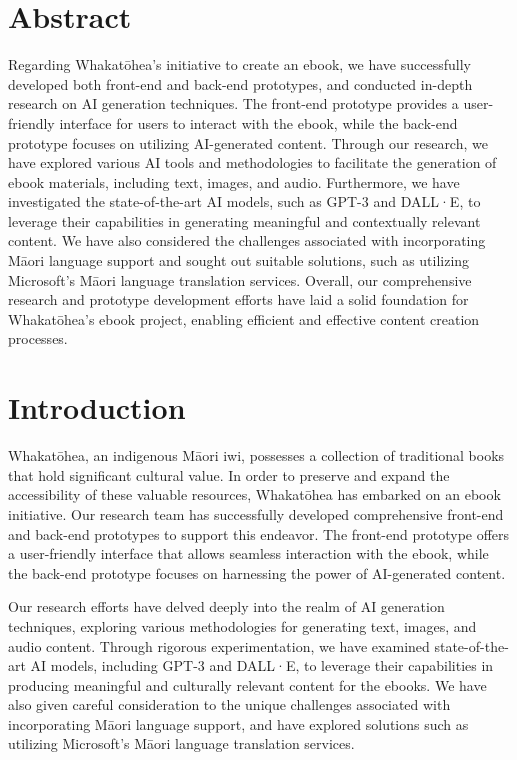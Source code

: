 \chapter{Abstract}

Regarding Whakatōhea's initiative to create an ebook, we have successfully developed both front-end and back-end prototypes, and conducted in-depth research on AI generation techniques. The front-end prototype provides a user-friendly interface for users to interact with the ebook, while the back-end prototype focuses on utilizing AI-generated content. Through our research, we have explored various AI tools and methodologies to facilitate the generation of ebook materials, including text, images, and audio. Furthermore, we have investigated the state-of-the-art AI models, such as GPT-3 and DALL·E, to leverage their capabilities in generating meaningful and contextually relevant content. We have also considered the challenges associated with incorporating Māori language support and sought out suitable solutions, such as utilizing Microsoft's Māori language translation services. Overall, our comprehensive research and prototype development efforts have laid a solid foundation for Whakatōhea's ebook project, enabling efficient and effective content creation processes.

\chapter{Introduction}

Whakatōhea, an indigenous Māori iwi, possesses a collection of traditional books that hold significant cultural value. In order to preserve and expand the accessibility of these valuable resources, Whakatōhea has embarked on an ebook initiative. Our research team has successfully developed comprehensive front-end and back-end prototypes to support this endeavor. The front-end prototype offers a user-friendly interface that allows seamless interaction with the ebook, while the back-end prototype focuses on harnessing the power of AI-generated content.

Our research efforts have delved deeply into the realm of AI generation techniques, exploring various methodologies for generating text, images, and audio content. Through rigorous experimentation, we have examined state-of-the-art AI models, including GPT-3 and DALL·E, to leverage their capabilities in producing meaningful and culturally relevant content for the ebooks. We have also given careful consideration to the unique challenges associated with incorporating Māori language support, and have explored solutions such as utilizing Microsoft's Māori language translation services.


